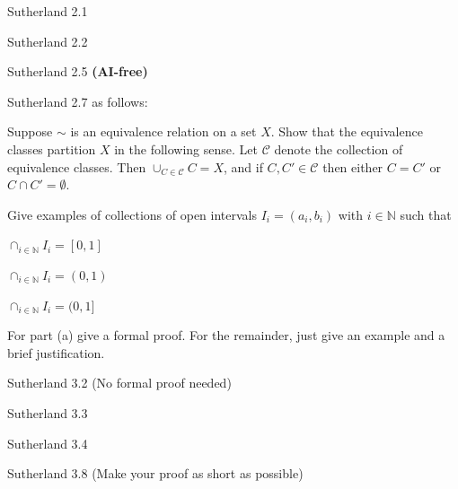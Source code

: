 \documentclass[minion]{homework}
\newcommand{\Nats}{\ensuremath{\mathbb N}} %
\begin{document}
\begin{problems}
\problem Sutherland 2.1

\problem Sutherland 2.2

\problem Sutherland 2.5 \textbf{(AI-free)}

\problem Sutherland 2.7 as follows:

Suppose $\sim$ is an equivalence relation on a set $X$.
Show that the equivalence classes partition $X$ in the 
following sense.  Let $\mathcal C$ denote the collection of
equivalence classes.  Then $\cup_{C\in\mathcal C} C =X$,
and if $C,C'\in\mathcal C$ then either $C=C'$ or $C\cap C'=\emptyset$.

\problem Give examples of collections of open intervals $I_i=(a_i,b_i)$
with $i\in \Nats$ such that 
\begin{subproblems}
\item $\cap_{i\in\Nats} I_i = [0,1]$
\item $\cap_{i\in\Nats} I_i = (0,1)$
\item $\cap_{i\in\Nats} I_i = (0,1]$
\end{subproblems}
For part (a) give a formal proof.  For the remainder, just give an example and a brief justification.

\problem Sutherland 3.2 (No formal proof needed)

\problem Sutherland 3.3

\problem Sutherland 3.4

\problem Sutherland 3.8 (Make your proof as short as possible)

\end{problems}
\end{document}
